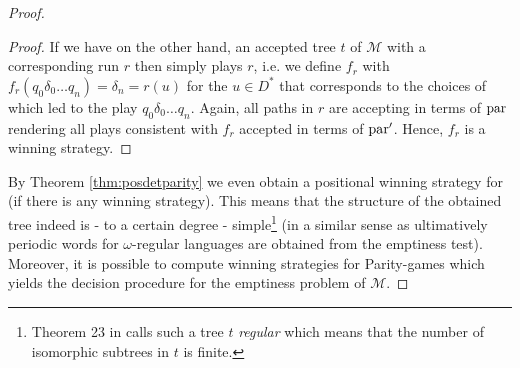 \begin{proof}
\begin{proof}
    If we have on the other hand, an accepted tree $t$ of $\mathcal{M}$ with
    a corresponding run $r$ then \automaton{} simply plays $r$, i.e. we define
    $f_{r}$ with $f_{r}(q_{0}\delta_{0}\dots q_{n}) = \delta_{n} = r(u)$ for 
    the $u\in D^{*}$ that corresponds to the choices of \pathfinder{} which led 
    to the play $q_{0}\delta_{0}\dots q_{n}$. Again, all paths in $r$ are 
    accepting in terms of $\operatorname{par}$ rendering all plays consistent with $f_{r}$ 
    accepted in terms of $\operatorname{par}'$. Hence, $f_{r}$ is a winning strategy.
  \end{proof}
  By Theorem \ref{thm:posdetparity} we even obtain a positional winning 
  strategy for \automaton{} (if there is any winning strategy). This means that
  the structure of the obtained tree indeed is - to a certain degree - 
  simple\footnote{
    Theorem 23 in \cite{ParityGamesPosDet} calls such a tree $t$ \emph{regular} 
    which means that the number of isomorphic subtrees in $t$ is finite.
  } (in a similar sense as ultimatively periodic words for $\omega$-regular
  languages are obtained from the emptiness test).
  Moreover, it is possible to compute winning strategies for Parity-games which
  yields the decision procedure for the emptiness problem of $\mathcal{M}$.
\end{proof}
